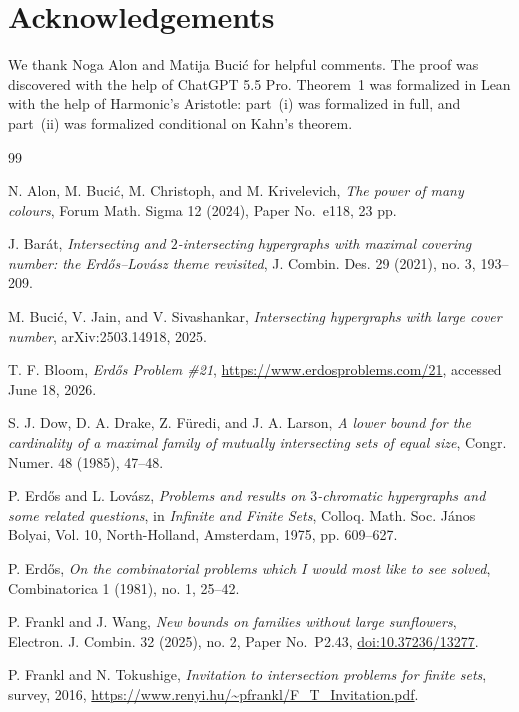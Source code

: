 \documentclass[11pt]{amsart}
\theoremstyle{remark}
\begin{document}
\section*{Acknowledgements}

We thank Noga Alon and Matija Buci\'c for helpful comments.
The proof was discovered with the help of ChatGPT 5.5 Pro.
Theorem~1 was formalized in Lean with the help of Harmonic's Aristotle:
part~(i) was formalized in full, and part~(ii) was formalized conditional on
Kahn's theorem.

\begin{thebibliography}{99}

N. Alon, M. Buci\'c, M. Christoph, and M. Krivelevich,
\emph{The power of many colours},
Forum Math. Sigma 12 (2024), Paper No.\ e118, 23 pp.

J. Bar\'at,
\emph{Intersecting and $2$-intersecting hypergraphs with maximal covering
number: the Erd\H{o}s--Lov\'asz theme revisited},
J. Combin. Des. 29 (2021), no. 3, 193--209.

M. Buci\'c, V. Jain, and V. Sivashankar,
\emph{Intersecting hypergraphs with large cover number},
arXiv:2503.14918, 2025.

T. F. Bloom,
\emph{Erd\H{o}s Problem \#21},
\url{https://www.erdosproblems.com/21},
accessed June 18, 2026.

S. J. Dow, D. A. Drake, Z. F\"uredi, and J. A. Larson,
\emph{A lower bound for the cardinality of a maximal family of mutually
intersecting sets of equal size},
Congr. Numer. 48 (1985), 47--48.

P. Erd\H{o}s and L. Lov\'asz,
\emph{Problems and results on $3$-chromatic hypergraphs and some related
questions},
in \emph{Infinite and Finite Sets},
Colloq. Math. Soc. J\'anos Bolyai, Vol. 10,
North-Holland, Amsterdam, 1975, pp. 609--627.

P. Erd\H{o}s,
\emph{On the combinatorial problems which I would most like to see solved},
Combinatorica 1 (1981), no. 1, 25--42.

P. Frankl and J. Wang,
\emph{New bounds on families without large sunflowers},
Electron. J. Combin. 32 (2025), no. 2, Paper No.\ P2.43,
\href{https://doi.org/10.37236/13277}{doi:10.37236/13277}.

P. Frankl and N. Tokushige,
\emph{Invitation to intersection problems for finite sets},
survey, 2016,
\url{https://www.renyi.hu/~pfrankl/F_T_Invitation.pdf}.


\end{thebibliography}
\end{document}
